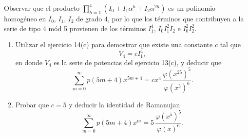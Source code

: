     \begin{ejercicio}
        Observar que el producto $\prod_{h=1}^{4}(I_0+I_1\alpha^h+I_2\alpha^{2h})$ es un
        polinomio homogéneo en $I_0$, $I_1$, $I_2$ de grado 4, por lo que los términos que
        contribuyen a la serie de tipo 4 mód 5 provienen de los términos $I_1^4$, $I_0I_1^2I_2$
        e $I_0^2I_2^2$.
        \begin{enumerate}
            \item[(a)] Utilizar el ejercicio 14(c) para demostrar que existe una constante $c$
            tal que
            \begin{equation*}
                V_4=cI_1^4,
            \end{equation*}
            en donde $V_4$ es la serie de potencias del ejercicio 13(c), y deducir que
            \begin{equation*}
                \sum_{m=0}^{\infty}p(5m+4)x^{5m+4}=cx^4\,\frac{\varphi(x^{25})^5}{\varphi(x^5)^6}.
            \end{equation*}
            \item[(b)] Probar que $c=5$ y deducir la identidad de Ramanujan
            \begin{equation*}
                \sum_{m=0}^{\infty}p(5m+4)x^m=5\,\frac{\varphi(x^5)^5}{\varphi(x)^6}.
            \end{equation*}
        \end{enumerate}
    \end{ejercicio}

